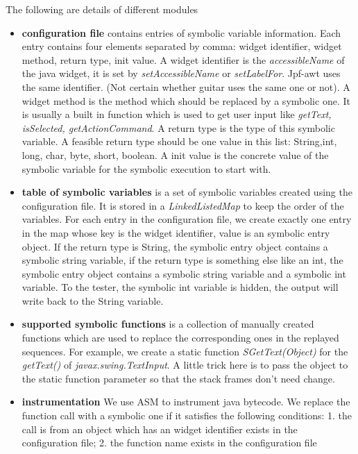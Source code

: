 \documentclass[blind]{sig-alternate-05-2015}
\begin{document}
The following are details of different modules
\begin{itemize}
  \item{\textbf{configuration file} contains entries of symbolic variable information. Each entry contains four elements separated by comma: widget identifier, widget method, return type, init value. A widget identifier is the \textit{accessibleName} of the java widget, it is set by \textit{setAccessibleName} or \textit{setLabelFor}. Jpf-awt uses the same identifier. (Not certain whether guitar uses the same one or not)}. A widget method is the method which should be replaced by a symbolic one. It is usually a built in function which is used to get user input like \textit{getText, isSelected, getActionCommand}. A return type is the type of this symbolic variable. A feasible return type should be one value in this list: {String,int, long, char, byte, short, boolean}. A init value is the concrete value of the symbolic variable for the symbolic execution to start with.

  \item{\textbf{table of symbolic variables}} is a set of symbolic variables created using the configuration file. It is stored in a \textit{LinkedListedMap} to keep the order of the variables. For each entry in the configuration file, we create exactly one entry in the map whose key is the widget identifier, value is an symbolic entry object. If the return type is String, the symbolic entry object contains a symbolic string variable, if the return type is something else like an int, the symbolic entry object contains a symbolic string variable and a symbolic int variable. To the tester, the symbolic int variable is hidden, the output will write back to the String variable.

  \item{\textbf{supported symbolic functions}} is a collection of manually created functions which are used to replace the corresponding ones in the replayed sequences. For example, we create a static function \textit{SGetText(Object)} for the \textit{getText()} of \textit{javax.swing.TextInput}. A little trick here is to pass the object  to the static function parameter so that the stack frames don't need change.

  \item{\textbf{instrumentation} We use ASM to instrument java bytecode. We replace the function call with a symbolic one if it satisfies the following conditions: 1. the call is from an object which has an widget identifier exists in the configuration file; 2. the function name exists in the configuration file}


\end{itemize}
\end{document}
